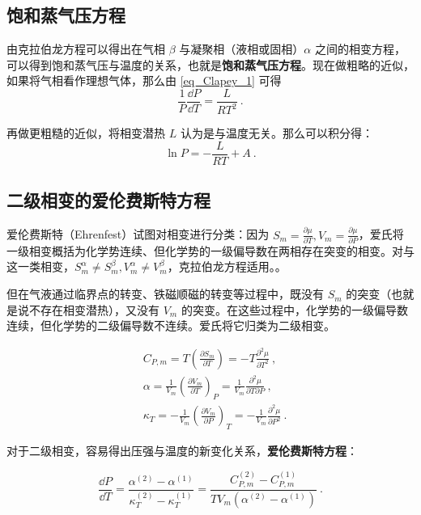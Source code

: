 \subsection{饱和蒸气压方程}

由克拉伯龙方程可以得出在气相 $\beta$ 与凝聚相（液相或固相）$\alpha$ 之间的相变方程，可以得到饱和蒸气压与温度的关系，也就是\textbf{饱和蒸气压方程}。现在做粗略的近似，如果将气相看作理想气体，那么由 \autoref{eq_Clapey_1} 可得
\begin{equation}
\frac{1}{P}\frac{\dd P}{\dd T}=\frac{L}{RT^2}~.
\end{equation}

再做更粗糙的近似，将相变潜热 $L$ 认为是与温度无关。那么可以积分得：
\begin{equation}\label{eq_Clapey_2}
\ln P=-\frac{L}{RT}+A~.
\end{equation}

\subsection{二级相变的爱伦费斯特方程}

爱伦费斯特（Ehrenfest）试图对相变进行分类：因为 $S_m=\frac{\partial \mu}{\partial T},V_m=\frac{\partial \mu}{\partial P}$，爱氏将一级相变概括为化学势连续、但化学势的一级偏导数在两相存在突变的相变。对与这一类相变，$S_m^\alpha\neq S_m^\beta,V_m^\alpha\neq V_m^\beta$，克拉伯龙方程适用。。

但在气液通过临界点的转变、铁磁顺磁的转变等过程中，既没有 $S_m$ 的突变（也就是说不存在相变潜热），又没有 $V_m$ 的突变。在这些过程中，化学势的一级偏导数连续，但化学势的二级偏导数不连续。爱氏将它归类为二级相变。

\begin{align}
&C_{P,m}=T\left(\frac{\partial S_m}{\partial T}\right)=-T\frac{\partial^2 \mu}{\partial T^2}~,\\
&\alpha=\frac{1}{V_m}\left(\frac{\partial V_m}{\partial T}\right)_P
=\frac{1}{V_m}\frac{\partial^2\mu}{\partial T\partial P}~,\\
&\kappa_T=-\frac{1}{V_m}\left(\frac{\partial V_m}{\partial P}\right)_T
=-\frac{1}{V_m}\frac{\partial^2\mu}{\partial P^2}~.
\end{align}

对于二级相变，容易得出压强与温度的新变化关系，\textbf{爱伦费斯特方程}：

\begin{equation}
\frac{\dd P}{\dd T}=\frac{\alpha^{(2)}-\alpha^{(1)}}{\kappa_T^{(2)}-\kappa_T^{(1)}}=\frac{C_{P,m}^{(2)}-C_{P,m}^{(1)}}{TV_m(\alpha^{(2)}-\alpha^{(1)})}~.
\end{equation}
